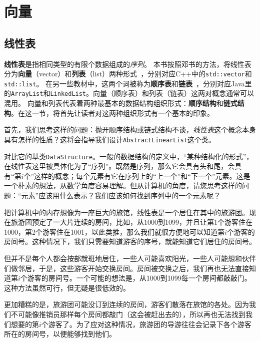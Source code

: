 
\chapter{向量}

\section{线性表}

\textbf{线性表}是指相同类型的有限个数据组成的\textit{序列}。
本书按照邓书的方法，将线性表分为\textbf{向量}（vector）和\textbf{列表}（list）两种形式~\cite{邓俊辉2013数据结构}，分别对应C++中的\lstinline{std::vector}和\lstinline{std::list}。
在另一些教材中，这两个词被称为\textbf{顺序表}和\textbf{链表}~\cite{严蔚敏1997数据结构}，分别对应Java里的\lstinline{ArrayList}和\lstinline{LinkedList}。向量（顺序表）和列表（链表）这两对概念通常可以混用。
向量和列表代表着两种最基本的数据结构组织形式：\textbf{顺序结构}和\textbf{链式结构}。在这一节，将首先让读者对这两种组织形式有一个基本的印象。

首先，我们思考这样的问题：抛开顺序结构或链式结构不谈，\textit{线性表}这个概念本身具有怎样的性质？这将会指导我们设计\lstinline{AbstractLinearList}这个类。

对比它的基类\lstinline{DataStructure}。一般的数据结构的定义中，“某种结构化的形式”，在线性表这里被具体化为了“序列”。既然是序列，那么它会具有头和尾，会具有“第$i$个”这样的概念；每个元素有它在序列上的“上一个”和“下一个”元素。这是一个朴素的想法，从数学角度容易理解。但从计算机的角度，请您思考这样的问题：“元素”应该用什么表示？我们应该如何找到序列中的一个元素呢？

把计算机中的内存想像为一座巨大的旅馆，线性表是一个居住在其中的旅游团。现在旅游团预定了一大片连续的房间，比如，从1000到1099，并且让第1个游客住在1000，第2个游客住在1001，以此类推，那么我们就很方便地可以知道第$i$个游客的房间号。这种情况下，我们只需要知道游客的序号，就能知道它们居住的房间号。

但并不是每个人都会按部就班地居住，一些人可能喜欢阳光，一些人可能想和伙伴们做邻居，于是，这些游客开始交换房间。房间被交换之后，我们再也无法直接知道第$i$个游客的房间号。一个可能的想法是，从1000到1099每一个房间都敲敲门。这种方法虽然可行，但无疑是很低效的。

更加糟糕的是，旅游团可能没订到连续的房间，游客们散落在旅馆的各处。因为我们不可能像推销员那样每个房间都敲门（这会被赶出去的），所以再也无法找到我们想要的第$i$个游客了。为了应对这种情况，旅游团的导游往往会记录下各个游客所在的房间号，以便能够找到他们。

